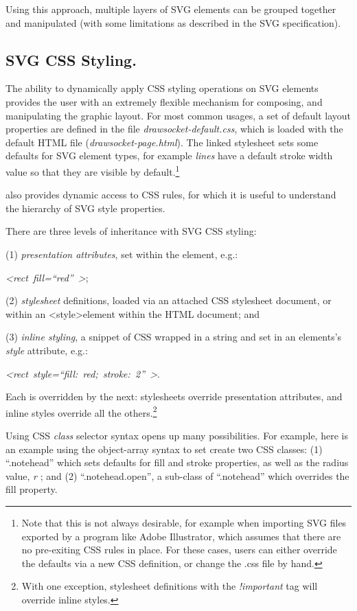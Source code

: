 Using this approach, multiple layers of SVG elements can be grouped together and manipulated (with some limitations as described in the SVG specification).

\subsection{SVG CSS Styling.} 
The ability to dynamically apply CSS styling operations on SVG elements provides the user with an extremely flexible mechanism for composing, and manipulating the graphic layout.
For most common \drawsocket usages, a set of default layout properties are defined in the file \textit{drawsocket-default.css}, which is loaded with the default HTML file (\textit{drawsocket-page.html}).
The linked stylesheet sets some defaults for SVG element types, for example \textit{lines} have a default stroke width value so that they are visible by default.\footnote{Note that this is not always desirable, for example when importing SVG files exported by a program like Adobe Illustrator, which assumes that there are no pre-exiting CSS rules in place. For these cases, \drawsocket users can either override the defaults via a new CSS definition, or change the .css file by hand.}

\drawsocket also provides dynamic access to CSS rules, for which it is useful to understand the hierarchy of SVG style properties. 

There are three levels of inheritance with SVG CSS styling: 

(1) \textit{presentation attributes}, set within the element, e.g.:

\textit{\textless rect~fill=``red''~\textgreater}; 

(2) \textit{stylesheet} definitions, loaded via an attached CSS stylesheet document, or within an \textless style\textgreater element within the HTML document;
and

(3) \textit{inline styling}, a snippet of CSS wrapped in a string and set in an elements's \textit{style} attribute, e.g.:

\textit{\textless rect~style=``fill:~red;~stroke:~2''~\textgreater}.

Each is overridden by the next: stylesheets override presentation attributes, and inline styles override all the others.\footnote{With one exception, stylesheet definitions with the \textit{!important} tag will override inline styles.} 

Using CSS \textit{class} selector syntax opens up many possibilities.
For example, here is an example using the object-array syntax to set create two CSS classes: (1) ``.notehead'' which sets defaults for fill and stroke properties, as well as the radius value, \textit{r} ; and (2) ``.notehead.open'', a sub-class of ``.notehead'' which overrides the fill property. 

